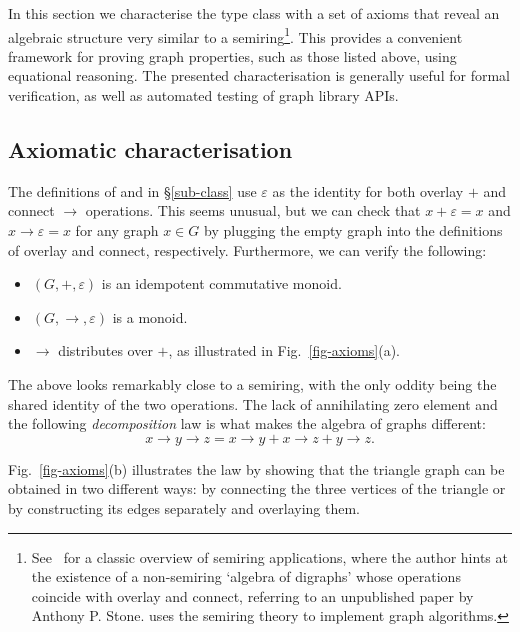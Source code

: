 In this section we characterise the  type class with a set of
axioms that reveal an algebraic structure very similar to a semiring\footnote{
See~\citet{1999_semirings_golan} for a classic overview of semiring
applications, where the author hints at the existence of a non-semiring `algebra of
digraphs' whose operations coincide with overlay and connect, referring to an unpublished
paper by Anthony P. Stone. \citet{2013_semirings_dolan} uses the semiring theory to
implement graph algorithms.}.
This provides a convenient framework for proving graph properties, such as
those listed above, using equational reasoning. The presented characterisation is
generally useful for formal verification, as well as automated testing of graph library
APIs.

\subsection{Axiomatic characterisation}\label{sub-laws}

The definitions of  and  in \S\ref{sub-class}
use $\varepsilon$ as the identity for both overlay $+$ and connect $\rightarrow$
operations. This seems unusual, but we can check that
$x + \varepsilon = x$ and $x \rightarrow \varepsilon = x$ for any graph $x \in G$
by plugging the empty graph into the definitions of overlay and connect,
respectively. Furthermore, we can verify the following:
\begin{itemize}
    \item $(G,+,\varepsilon)$ is an idempotent commutative monoid.
    \item $(G,\rightarrow,\varepsilon)$ is a monoid.
    \item $\rightarrow$ distributes over $+$, as illustrated
    in Fig.~\ref{fig-axioms}(a).
\end{itemize}

\noindent
The above looks remarkably close to a semiring, with the only oddity being the shared
identity of the two operations. The lack of annihilating zero element and the
following \emph{decomposition} law is what makes the algebra of graphs different:
\[
x \rightarrow y \rightarrow z = x \rightarrow y + x \rightarrow z + y \rightarrow z.
\]

\noindent
Fig.~\ref{fig-axioms}(b) illustrates the law by showing that the triangle
graph can be obtained in two different ways: by connecting the three vertices
of the triangle or by constructing its edges separately and overlaying them.

